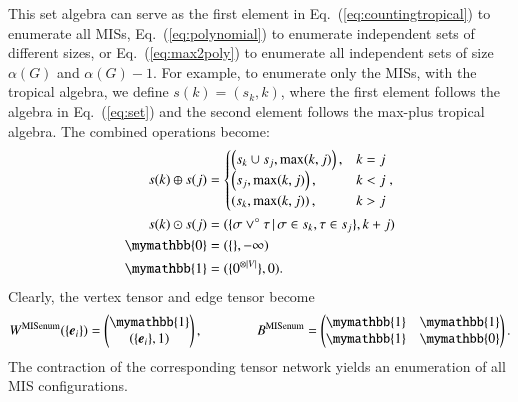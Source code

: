 \documentclass[onefignum, onetabnum]{siamart190516}
\newcommand{\<}{\langle}
\renewcommand{\>}{\rangle}
\newcommand{\Eq}[1]{Eq.~(\ref{#1})}
\newcounter{example}
\begin{document}
This set algebra can serve as the first element in \Eq{eq:countingtropical} to enumerate all MISs, \Eq{eq:polynomial} to enumerate independent sets of different sizes,
or \Eq{eq:max2poly} to enumerate all independent sets of size $\alpha(G)$ and $\alpha(G)-1$.
For example, to enumerate only the MISs, with the tropical algebra, we define $s(k) = (s_{k}, k)$, where the first element follows the algebra in \Eq{eq:set} and the second element follows the max-plus tropical algebra.
The combined operations become: 
\begin{equation}
\begin{split}
    s(k) \oplus s(j) &= \begin{cases}
        \left(s_k \cup s_j, \max(k,j) \right), & k = j \\
        \left(s_j, \max(k,j) \right), & k < j \\
        \left(s_k, \max(k,j) \right), & k > j
    \end{cases}, \\
    s(k) \odot s(j) &= (\{\sigma \lor^\circ \tau \, | \, \sigma \in s_k, \tau \in s_j\}, k+j) \\
    \mymathbb{0} &= (\{ \}, -\infty)\\
    \mymathbb{1} &= (\{0^{\otimes |V|}\}, 0). \label{eq:countingtropicalset}
\end{split}
\end{equation}
Clearly, the vertex tensor and edge tensor become
\begin{equation}
    W^{\rm MISenum}(\{\boldsymbol{e}_{i}\}) = \left(\begin{matrix}
        \mymathbb{1} \\
        \left({\{\boldsymbol{e}_{i}\}, 1} \right)
    \end{matrix}\right),   
    \qquad \qquad
        B^{\rm MISenum} = \left(\begin{matrix}
        \mymathbb{1}  & \mymathbb{1} \\
        \mymathbb{1} & \mymathbb{0}
    \end{matrix}\right).
\end{equation}
The contraction of the corresponding tensor network yields an enumeration of all MIS configurations.
\end{document}
